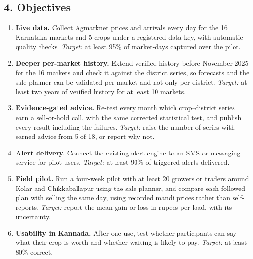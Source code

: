\documentclass[11pt,a4paper]{article}
\begin{document}
\subsection*{4. Objectives}
\begin{enumerate}[leftmargin=*,nosep]
\item \textbf{Live data.} Collect Agmarknet prices and arrivals every day for the 16 Karnataka markets and 5 crops under a registered data key, with automatic quality checks. \emph{Target:} at least 95\% of market-days captured over the pilot.
\item \textbf{Deeper per-market history.} Extend verified history before November 2025 for the 16 markets and check it against the district series, so forecasts and the sale planner can be validated per market and not only per district. \emph{Target:} at least two years of verified history for at least 10 markets.
\item \textbf{Evidence-gated advice.} Re-test every month which crop--district series earn a sell-or-hold call, with the same corrected statistical test, and publish every result including the failures. \emph{Target:} raise the number of series with earned advice from 5 of 18, or report why not.
\item \textbf{Alert delivery.} Connect the existing alert engine to an SMS or messaging service for pilot users. \emph{Target:} at least 90\% of triggered alerts delivered.
\item \textbf{Field pilot.} Run a four-week pilot with at least 20 growers or traders around Kolar and Chikkaballapur using the sale planner, and compare each followed plan with selling the same day, using recorded mandi prices rather than self-reports. \emph{Target:} report the mean gain or loss in rupees per load, with its uncertainty.
\item \textbf{Usability in Kannada.} After one use, test whether participants can say what their crop is worth and whether waiting is likely to pay. \emph{Target:} at least 80\% correct.
\end{enumerate}
\end{document}
